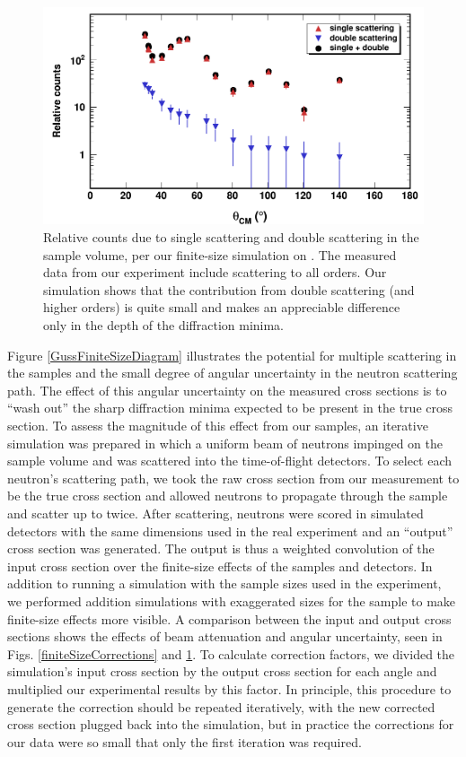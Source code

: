 \begin{figure}[tb]
    \centering
    \includegraphics[height=0.4\textheight]{figures/multipleScattering.png}
    \caption[Relative counts due to multiple scattering in the sample volume]
    {
        Relative counts due to single scattering and double scattering
        in the sample volume, per our finite-size simulation on \snFour. The
        measured data from our experiment include scattering to all orders. Our 
        simulation shows that the contribution from double scattering (and
        higher orders) is quite small and makes an appreciable difference only
        in the depth of the diffraction minima.
    }
    \label{multipleScattering}
\end{figure}
Figure \ref{GussFiniteSizeDiagram} illustrates the potential for multiple scattering in the samples
and the small degree of angular uncertainty in the neutron scattering path.
The effect of this angular uncertainty on the measured cross
sections is to ``wash out'' the sharp diffraction minima expected to be present in the true cross
section. To assess the magnitude of this effect from our
samples, an iterative simulation was prepared in which a uniform beam of neutrons
impinged on the sample volume and was scattered into the time-of-flight
detectors. To select each neutron's scattering path, we took the
raw cross section from our measurement to be the true cross section and allowed
neutrons to propagate through the sample and scatter up to twice. After
scattering, neutrons were scored in simulated detectors with the same dimensions
used in the real experiment and an ``output'' cross section was generated. The
output is thus a weighted convolution of the input cross section
over the finite-size effects of the samples and detectors. In addition to
running a simulation with the sample sizes used in the experiment, we performed
addition simulations with exaggerated sizes for the
sample to make finite-size effects more visible. A comparison between the input
and output cross sections shows the effects of beam attenuation and angular
uncertainty, seen in Figs. \ref{finiteSizeCorrections} and
\ref{multipleScattering}.
To calculate correction factors, we divided the simulation's
input cross section by the output cross section for each angle and multiplied our
experimental results by this factor. In principle, this procedure to generate
the correction should be repeated iteratively, with the new corrected cross
section plugged back into the simulation, but in practice the corrections for
our data were so small that only the first iteration was required.
